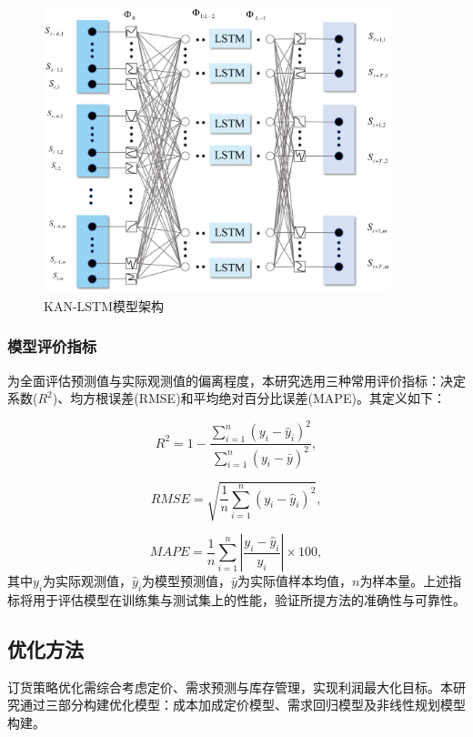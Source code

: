 \documentclass[lang=cn,12pt,a4paper]{elegantpaper}
\begin{document}
\begin{figure}[H]
        \centering
        \includegraphics[width=0.9\textwidth]{图片3.png}
        \caption{KAN-LSTM模型架构}
        \label{fig:fig3}
\end{figure}

\subsubsection{模型评价指标}
\label{subsubsec:model_evaluation_metrics}
为全面评估预测值与实际观测值的偏离程度，本研究选用三种常用评价指标：决定系数($R^2$)、均方根误差(RMSE)和平均绝对百分比误差(MAPE)。其定义如下：

\begin{equation}
R^2 = 1 - \frac{\sum_{i=1}^{n} (y_i - \hat{y}_i)^2}{\sum_{i=1}^{n} (y_i - \bar{y})^2},
\end{equation}

\begin{equation}
RMSE = \sqrt{\frac{1}{n} \sum_{i=1}^{n} (y_i - \hat{y}_i)^2},
\end{equation}

\begin{equation}
MAPE = \frac{1}{n} \sum_{i=1}^{n} \left| \frac{y_i - \hat{y}_i}{y_i} \right| \times 100,
\end{equation}
其中$y_i$为实际观测值，$\hat{y}_i$为模型预测值，$\bar{y}$为实际值样本均值，$n$为样本量。上述指标将用于评估模型在训练集与测试集上的性能，验证所提方法的准确性与可靠性。
\subsection{优化方法}
\label{subsec:optimization_method}
订货策略优化需综合考虑定价、需求预测与库存管理，实现利润最大化目标。本研究通过三部分构建优化模型：成本加成定价模型、需求回归模型及非线性规划模型构建。
\end{document}

